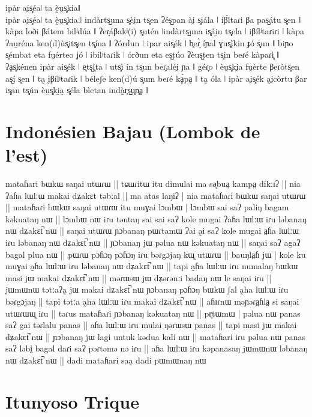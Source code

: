 {ipàr ai̯s̻éaǀ ta ḛ̀u̯s̻kiaǁ\\
ipàr ai̯s̻éaǀ ta ḛ̀u̯s̻kiaːǀ indàrts̺una s̻èi̯n ts̻en ʔés̺pan ài̯ s̻iála ǀ iβ́ltaɾi βa pas̺átu s̻en ǁ
kàpa loði βátem bilʲdúa ǁ ʔeɾ̞áβakʲ(i) s̻utén ǀindàrts̺una is̻ái̯n ts̻ela ǀ
iβílʲtaɾiɾi ǀ kàpa ʔau̯réna ken(d)ùs̻its̻en ts̻ína ǁ 
ʔórdun ǀ ipar ais̻ék ǀ b̥eɾ̞̀ íɲal ɣus̻ìkin ɟó s̻un ǁ biɲo s̻émbat eta fu̯érteo ʝó ǀ ibílʲtaɾik ǀ
órðun eta es̺túo ʔèus̺ten ts̻in beɾé kàpaɾi̻ ǁ
ʔḁs̻kénen ipàr ais̻ék ǀ e̥ts̺ì̥ta ǀ uts̻ì ín ts̻un beɾ̞aléi̯ ɲa ǁ
géɾ̞o ǀ èu̯s̻ki̯a fu̯èrte βeɾòts̻en as̺í s̻en ǁ
ta̰ ḭβílʲtaɾik ǀ béleʃe ken(d)ú s̻um beɾé kḁ̀pḁ ǁ
ta̰ óla ǀ ipàr ai̯s̻ék a̰i̯còrtu βar is̻an ts̻ún èu̯s̻kḭa̰ s̻éla bìetan indà̰r̥s̺u̥n̥ḁ ǁ}

\section[Indonésien Bajau]{Indonésien Bajau (Lombok de l'est) \parencite{archangeliIndonesianBajauEast2019}\\}

{mataɦari bɯkɯ saŋai utɯɾɯ || tɕɯɾitɯ itu dimulai ma sə̥bua̤ kampa̤
dikːɪʔ || nia ʔaɦa lɯlːɯ makai dʑakɛt təbːal || ma atas laŋiʔ | nia
mataɦaɾi bɯkɯ saŋai utɯɾɯ || mataɦaɾi bɯkɯ saŋai utɯɾɯ itu muɣai
lɔmbɯ | lɔmbɯ sai saʔ paliŋ bagam kəkuataŋ nɯ ||
lɔmbɯ nɯ  iɾu təntaŋ sai sai saʔ kole mugai ʔaɦa lɯlːɯ
iɾu ləbanaŋ nɯ dʑakɛt̚ nɯ || saŋai utɯɾɯ ɲɔbanaŋ pɯɾtamɯ
ʔai a̰i saʔ kole mugai a̤ɦa lɯlːɯ iɾu ləbanaŋ nɯ dʑakɛt̚
nɯ || ɲɔbanaŋ jɯ pəlua nɯ kəkuataŋ nɯ || saŋai saʔ
agaʔ bagal plua nɯ || pɯɾɯ pɔɦɔŋ pɔɦɔŋ iɾu bəɾgɔjaŋ kɯ̰
utɯɾɯ || bauŋla̤ɦ jɯ | kole ku muɣai a̰ɦa lɯlːɯ iɾu
ləbanaŋ nɯ dʑakɛt̚ nɯ || tapi a̰ɦa lɯlːɯ iɾu numalaŋ
bɯkɯ masi jɯ makai dʑakɛt̚ nɯ || məɾɯsɯ jɯ dʑəɾənːi
badaŋ nɯ le saŋai iɾu || jɯmɯnɯ tətːaʔa̰ jɯ makai
dʑakɛt̚ nɯ ɲɔbanaŋ pɔɦɔŋ bɯkɯ ʃal a̰ha lɯlːɯ iɾu bəɾgɔjaŋ ||
tapi tətːa a̰ha lɯlːɯ iɾu makai dʑakɛt̚ nɯ || aɦɪɾnɯ
məɲəɾa̤ɦla̤ si saŋai utɯɾɯɯ̰ iɾu || təɾus mataɦaɾi ɲɔbanaŋ
kəkuataŋ nɯ || pr̥tɯmɯ | pəlua nɯ panas saʔ gai
təɾlalu panas || aɦa lɯlːɯ iɾu mulai ŋəɾɯsɯ panas || tapi masi
jɯ makai dʑakɛt̚ nɯ || ɲɔbanaŋ jɯ lagi untuk kədua kali
nɯ || mataɦari iɾu pəlua nɯ panas saʔ ləbi̤ bagal daɾi saʔ
pəɾtəmə nə iɾu || aɦa lɯlːɯ iɾu kəpanasaŋ jɯmɯnɯ
ləbanaŋ nɯ dʑakɛt̚ nɯ || dadi mataɦari saa̰ dadi
pɯmɯnaŋ nɯ}

\section[Itunyoso Trique]{Itunyoso Trique \parencite{dicanioItunyosoTrique2010}\\}

